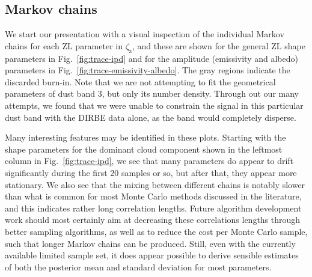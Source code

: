 \documentclass[twocolumn]{aa}
\begin{document}
\subsection{Markov chains}

We start our presentation with a visual inspection of the individual
Markov chains for each ZL parameter in $\zeta_{\mathrm{z}}$, and these
are shown for the general ZL shape parameters in
Fig.~\ref{fig:trace-ipd} and for the amplitude (emissivity and albedo)
parameters in Fig.~\ref{fig:trace-emissivity-albedo}. The gray regions
indicate the discarded burn-in.
Note that we are not attempting to fit the geometrical parameters of dust band 3, but only its number density. 
Through out our many attempts, we found that we were unable to constrain the signal in this particular dust band with the DIRBE data alone, 
as the band would completely disperse.

Many interesting features may be identified in these plots. Starting
with the shape parameters for the dominant cloud component shown in
the leftmost column in Fig.~\ref{fig:trace-ipd}, we see that many
parameters do appear to drift significantly during the first 20
samples or so, but after that, they appear more stationary. We also
see that the mixing between different chains is notably slower than
what is common for most Monte Carlo methods discussed in the
literature, and this indicates rather long correlation lengths. Future
algorithm development work should most certainly aim at decreasing
these correlations lengths through better sampling algorithms, as well
as to reduce the cost per Monte Carlo sample, such that longer Markov
chains can be produced. Still, even with the currently available
limited sample set, it does appear possible to derive sensible
estimates of both the posterior mean and standard deviation for most
parameters. 
\end{document}
